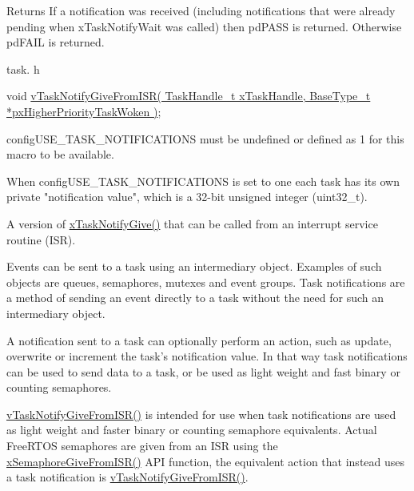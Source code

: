 \begin{DoxyReturn}{Returns}
If a notification was received (including notifications that were already pending when x\+Task\+Notify\+Wait was called) then pd\+P\+A\+SS is returned. Otherwise pd\+F\+A\+IL is returned.
\end{DoxyReturn}
task. h 
\begin{DoxyPre}void \hyperlink{task_8h_a4a4bcf98ad282a596e13f3f30582a11b}{vTaskNotifyGiveFromISR( TaskHandle\_t xTaskHandle, BaseType\_t *pxHigherPriorityTaskWoken )};\end{DoxyPre}



\begin{DoxyPre}configUSE\_TASK\_NOTIFICATIONS must be undefined or defined as 1 for this macro
to be available.\end{DoxyPre}



\begin{DoxyPre}When configUSE\_TASK\_NOTIFICATIONS is set to one each task has its own private
"notification value", which is a 32-bit unsigned integer (uint32\_t).\end{DoxyPre}



\begin{DoxyPre}A version of \hyperlink{task_8h_ac60cbd05577a3e4f3c3587dd9b213930}{xTaskNotifyGive()} that can be called from an interrupt service
routine (ISR).\end{DoxyPre}



\begin{DoxyPre}Events can be sent to a task using an intermediary object.  Examples of such
objects are queues, semaphores, mutexes and event groups.  Task notifications
are a method of sending an event directly to a task without the need for such
an intermediary object.\end{DoxyPre}



\begin{DoxyPre}A notification sent to a task can optionally perform an action, such as
update, overwrite or increment the task's notification value.  In that way
task notifications can be used to send data to a task, or be used as light
weight and fast binary or counting semaphores.\end{DoxyPre}



\begin{DoxyPre}\hyperlink{task_8h_a4a4bcf98ad282a596e13f3f30582a11b}{vTaskNotifyGiveFromISR()} is intended for use when task notifications are
used as light weight and faster binary or counting semaphore equivalents.
Actual FreeRTOS semaphores are given from an ISR using the
\hyperlink{semphr_8h_a68aa43df8b2a0dbe17d05fad74670ef0}{xSemaphoreGiveFromISR()} API function, the equivalent action that instead uses
a task notification is \hyperlink{task_8h_a4a4bcf98ad282a596e13f3f30582a11b}{vTaskNotifyGiveFromISR()}.\end{DoxyPre}



